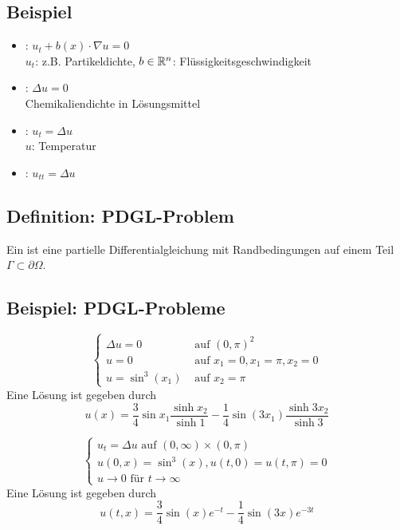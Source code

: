 \subsection{Beispiel}
	\begin{itemize}
		\item {}: $u_t + b(x) \cdot \nabla u = 0$ \\
		$u_t$: z.B. Partikeldichte, $b \in \mathbb{R}^n$: Flüssigkeitsgeschwindigkeit
		\item {}: $\Delta u = 0$ \\
		Chemikaliendichte in Lösungsmittel
		\item {}: $u_t = \Delta u$ \\
		$u$: Temperatur
		\item {}: $u_{tt} = \Delta u$
	\end{itemize}
	
\subsection{Definition: PDGL-Problem}
\label{def_pdgl_problem}
	Ein  ist eine partielle Differentialgleichung mit Randbedingungen auf einem Teil $\Gamma \subset \partial \Omega$.
	
\subsection{Beispiel: PDGL-Probleme}
	\[ \begin{cases}
		\Delta u = 0 & \text{ auf } (0,\pi)^2 \\
		u = 0 & \text{ auf } x_1=0, x_1=\pi, x_2 = 0 \\
		u = \sin^3(x_1) & \text{ auf } x_2 = \pi
		\end{cases} \]
		Eine Lösung ist gegeben durch
		\[ u(x) = \frac{3}{4} \sin x_1 \frac{\sinh x_2}{\sinh 1} - \frac{1}{4} \sin(3x_1) \frac{\sinh 3x_2}{\sinh 3} \]
		
	\[ \begin{cases}
		u_t = \Delta u \text{ auf } (0,\infty) \times (0, \pi) \\
		u(0,x) = \sin^3 (x), u(t,0) = u(t,\pi) = 0 \\
		u \rightarrow 0 \text{ für } t \rightarrow \infty
		\end{cases} \]
		Eine Lösung ist gegeben durch
		\[ u(t,x) = \frac{3}{4} \sin(x) e^{-t} - \frac{1}{4} \sin(3x) e^{-3t} \]
		
